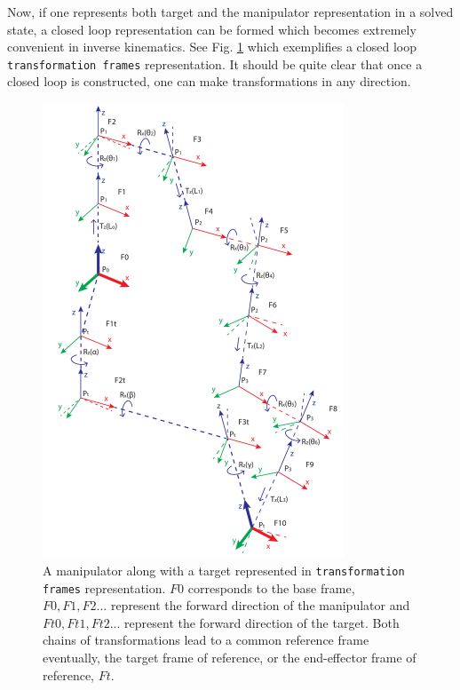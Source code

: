 {{        Now, if one represents both target and the manipulator representation in a solved state, a closed loop representation can be formed which becomes extremely convenient in inverse kinematics. See Fig. \ref{FigCompleteRep} which exemplifies a closed loop \texttt{transformation frames} representation. It should be quite clear that once a closed loop is constructed, one can make transformations in any direction.

        \begin{figure}
          \centering
          \includegraphics[width=0.8\textwidth]{CompleteRep.pdf}
          \caption{A manipulator along with a target represented in \texttt{transformation frames} representation. $F0$ corresponds to the base frame, $F0, F1, F2 ...$ represent the forward direction of the manipulator and $Ft0, Ft1, Ft2 ...$ represent the forward direction of the target. Both chains of transformations lead to a common reference frame eventually, the target frame of reference, or the end-effector frame of reference, $Ft$.
          } \label{FigCompleteRep}
        \end{figure}

}}
